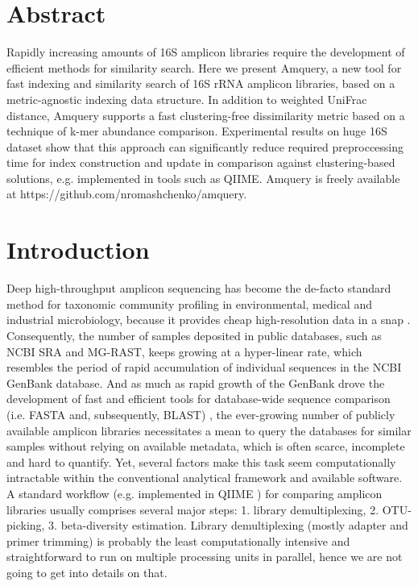 \documentclass[10pt,letterpaper]{article}
\begin{document}
\section*{Abstract}
Rapidly increasing amounts of 16S amplicon libraries require the development of efficient methods for similarity search. 
Here we present Amquery, a new tool for fast indexing and similarity search of 16S rRNA amplicon libraries, 
based on a metric-agnostic indexing data structure. In addition to weighted UniFrac distance, Amquery supports 
a fast clustering-free dissimilarity metric based on a technique of k-mer abundance comparison.
Experimental results on huge 16S dataset show that this approach can significantly reduce required preproccessing 
time for index construction and update in comparison against clustering-based solutions, e.g. implemented in tools such as QIIME.
Amquery is freely available at https://github.com/nromashchenko/amquery.

\linenumbers

\section*{Introduction}
Deep high-throughput amplicon sequencing has become the de-facto standard method for taxonomic community profiling in environmental, 
medical and industrial microbiology, because it provides cheap high-resolution data in a snap \cite{}. Consequently, the 
number of samples deposited in public databases, such as NCBI SRA and MG-RAST, keeps growing at a hyper-linear rate, 
which resembles the period of rapid accumulation of individual sequences in the NCBI GenBank database. 
And as much as rapid growth of the GenBank drove the development of fast and efficient tools for database-wide 
sequence comparison (i.e. FASTA and, subsequently, BLAST) \cite{}, the ever-growing number of publicly available amplicon 
libraries necessitates a mean to query the databases for similar samples without relying on available metadata, which is 
often scarce, incomplete and hard to quantify. Yet, several factors make this task seem computationally intractable within 
the conventional analytical framework and available software. A standard workflow (e.g. implemented in QIIME \cite{}) 
for comparing amplicon libraries usually comprises several major steps: 
1. library demultiplexing, 2. OTU-picking, 3. beta-diversity estimation. Library demultiplexing (mostly adapter and primer 
trimming) is probably the least computationally intensive and straightforward to run on multiple processing units in parallel, 
hence we are not going to get into details on that. 
\end{document}
